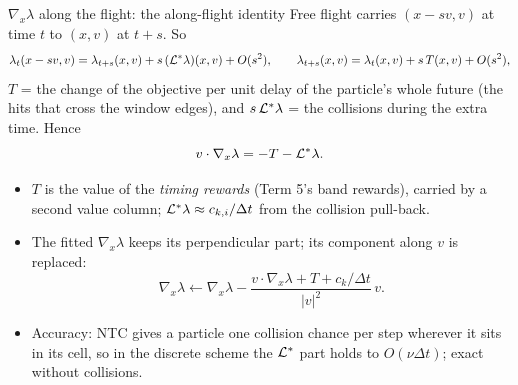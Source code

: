 \begin{frame}{$\nabla_x\lambda$ along the flight: the along-flight identity}
Free flight carries $(x - s v, v)$ at time $t$ to $(x, v)$ at $t + s$.  So
\[
\lambda_t(x - s v, v) = \lambda_{t+s}(x, v) + s\,(\mathcal L^*\lambda)(x,v) + O(s^2),
\qquad
\lambda_{t+s}(x,v) = \lambda_t(x,v) + s\,T(x,v) + O(s^2),
\]
$T$ = the change of the objective per unit delay of the particle's whole future (the hits
that cross the window edges), and $s\,\mathcal L^*\lambda$ = the collisions during the extra time.
Hence
\[
v\cdot\nabla_x\lambda = -T - \mathcal L^*\lambda .
\]
\begin{itemize}
\item $T$ is the value of the \emph{timing rewards} (Term 5's band rewards), carried by a
  second value column; $\mathcal L^*\lambda \approx c_{k,i}/\Delta t$ from the collision pull-back.
\item The fitted $\nabla_x\lambda$ keeps its perpendicular part; its component along $v$ is replaced:
\[
\nabla_x\lambda \leftarrow \nabla_x\lambda - \frac{v\cdot\nabla_x\lambda + T + c_{k}/\Delta t}{|v|^2}\,v .
\]
\item Accuracy: NTC gives a particle one collision chance per step wherever it sits in its
  cell, so in the discrete scheme the $\mathcal L^*$ part holds to $O(\nu\Delta t)$; exact without collisions.
\end{itemize}
\end{frame}

